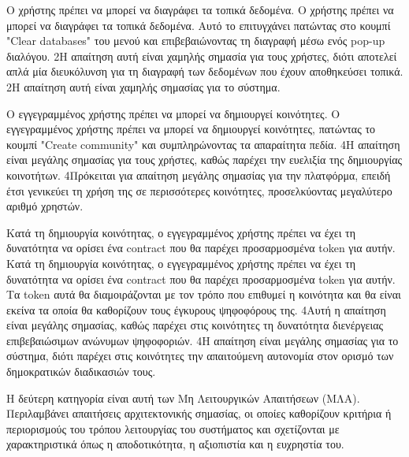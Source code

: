 \begin{enumerate}[label=\textbf{<ΛΑ-\arabic*>}, leftmargin=\parindent, align=left, labelwidth=\parindent, labelsep=0pt]
	\sysReqItem
		{\label{srs:functional-srs-delete-local-data}}
		{Ο χρήστης πρέπει να μπορεί να διαγράφει τα τοπικά δεδομένα.}
		{Ο χρήστης πρέπει να μπορεί να διαγράφει τα τοπικά δεδομένα. Αυτό το επιτυγχάνει πατώντας στο κουμπί "Clear databases" του μενού και επιβεβαιώνοντας τη διαγραφή μέσω ενός pop-up διαλόγου.}
		{2}{Η απαίτηση αυτή είναι χαμηλής σημασία για τους χρήστες, διότι αποτελεί απλά μία διευκόλυνση για τη διαγραφή των δεδομένων που έχουν αποθηκεύσει τοπικά.}
		{2}{Η απαίτηση αυτή είναι χαμηλής σημασίας για το σύστημα.}

	\sysReqItem
		{\label{srs:functional-srs-create-communities}}
		{Ο εγγεγραμμένος χρήστης πρέπει να μπορεί να δημιουργεί κοινότητες.}
		{Ο εγγεγραμμένος χρήστης πρέπει να μπορεί να δημιουργεί κοινότητες, πατώντας το κουμπί "Create community" και συμπληρώνοντας τα απαραίτητα πεδία.}
		{4}{Η απαίτηση είναι μεγάλης σημασίας για τους χρήστες, καθώς παρέχει την ευελιξία της δημιουργίας κοινοτήτων.}
		{4}{Πρόκειται για απαίτηση μεγάλης σημασίας για την πλατφόρμα, επειδή έτσι γενικεύει τη χρήση της σε περισσότερες κοινότητες, προσελκύοντας μεγαλύτερο αριθμό χρηστών.}

	\sysReqItem
		{\label{srs:functional-srs-assign-community-contract}}
		{Κατά τη δημιουργία κοινότητας, ο εγγεγραμμένος χρήστης πρέπει να έχει τη δυνατότητα να ορίσει ένα contract που θα παρέχει προσαρμοσμένα token για αυτήν.}
		{Κατά τη δημιουργία κοινότητας, ο εγγεγραμμένος χρήστης πρέπει να έχει τη δυνατότητα να ορίσει ένα contract που θα παρέχει προσαρμοσμένα token για αυτήν. Τα token αυτά θα διαμοιράζονται με τον τρόπο που επιθυμεί η κοινότητα και θα είναι εκείνα τα οποία θα καθορίζουν τους έγκυρους ψηφοφόρους της.}
		{4}{Αυτή η απαίτηση είναι μεγάλης σημασίας, καθώς παρέχει στις κοινότητες τη δυνατότητα διενέργειας επιβεβαιώσιμων ανώνυμων ψηφοφοριών.}
		{4}{Η απαίτηση είναι μεγάλης σημασίας για το σύστημα, διότι παρέχει στις κοινότητες την απαιτούμενη αυτονομία στον ορισμό των δημοκρατικών διαδικασιών τους.}
\end{enumerate}

Η δεύτερη κατηγορία είναι αυτή των Μη Λειτουργικών Απαιτήσεων (ΜΛΑ). Περιλαμβάνει απαιτήσεις αρχιτεκτονικής σημασίας, οι οποίες καθορίζουν κριτήρια ή περιορισμούς του τρόπου λειτουργίας του συστήματος και σχετίζονται με χαρακτηριστικά όπως η αποδοτικότητα, η αξιοπιστία και η ευχρηστία του.

